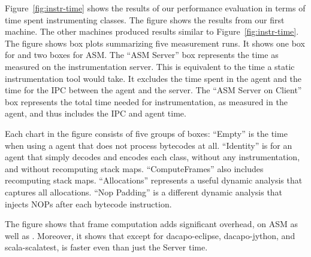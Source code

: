 Figure~\ref{fig:instr-time} shows the results of our performance evaluation
in terms of time spent instrumenting classes.
The figure shows the results from our first machine.
The other machines produced results similar to Figure~\ref{fig:instr-time}.
The figure shows box plots summarizing five measurement runs.
It shows one box for \jnif{} and two boxes for ASM.
The ``ASM Server'' box represents the time as measured on the instrumentation server.
This is equivalent to the time a static instrumentation tool would take.
It excludes the time spent in the \jvmti{} agent and the time for the IPC between the agent and the server.
The ``ASM Server on Client'' box represents the total time needed for instrumentation, 
as measured in the \jvmti{} agent,
and thus includes the IPC and \jvmti{} agent time.

Each chart in the figure consists of five groups of boxes:
``Empty'' is the time when using a \jvmti{} agent that does not process bytecodes at all.
``Identity'' is for an agent that simply decodes and encodes each class, without any instrumentation, and without recomputing stack maps.
``ComputeFrames'' also includes recomputing stack maps.
``Allocations'' represents a useful dynamic analysis that captures all allocations.
``Nop Padding'' is a different dynamic analysis that injects NOPs after each bytecode instruction. 

The figure shows that frame computation adds significant overhead,
on ASM as well as \jnif{}.
Moreover, it shows that except for dacapo-eclipse, dacapo-jython, and scala-scalatest,
\jnif{} is faster even than just the \asm{} Server time.

